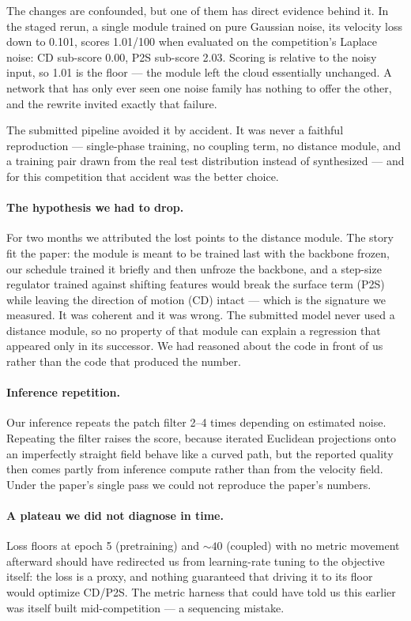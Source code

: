\documentclass{article}
\begin{document}
The changes are confounded, but one of them has direct evidence behind it. In the staged rerun, a single module trained on pure Gaussian noise, its velocity loss down to 0.101, scores 1.01/100 when evaluated on the competition's Laplace noise: CD sub-score 0.00, P2S sub-score 2.03. Scoring is relative to the noisy input, so 1.01 is the floor --- the module left the cloud essentially unchanged. A network that has only ever seen one noise family has nothing to offer the other, and the rewrite invited exactly that failure.

The submitted pipeline avoided it by accident. It was never a faithful reproduction --- single-phase training, no coupling term, no distance module, and a training pair drawn from the real test distribution instead of synthesized --- and for this competition that accident was the better choice.

\paragraph{The hypothesis we had to drop.} For two months we attributed the lost points to the distance module. The story fit the paper: the module is meant to be trained last with the backbone frozen, our schedule trained it briefly and then unfroze the backbone, and a step-size regulator trained against shifting features would break the surface term (P2S) while leaving the direction of motion (CD) intact --- which is the signature we measured. It was coherent and it was wrong. The submitted model never used a distance module, so no property of that module can explain a regression that appeared only in its successor. We had reasoned about the code in front of us rather than the code that produced the number.

\paragraph{Inference repetition.} Our inference repeats the patch filter 2--4 times depending on estimated noise. Repeating the filter raises the score, because iterated Euclidean projections onto an imperfectly straight field behave like a curved path, but the reported quality then comes partly from inference compute rather than from the velocity field. Under the paper's single pass we could not reproduce the paper's numbers.

\paragraph{A plateau we did not diagnose in time.} Loss floors at epoch 5 (pretraining) and ${\sim}40$ (coupled) with no metric movement afterward should have redirected us from learning-rate tuning to the objective itself: the loss is a proxy, and nothing guaranteed that driving it to its floor would optimize CD/P2S. The metric harness that could have told us this earlier was itself built mid-competition --- a sequencing mistake.
\end{document}
